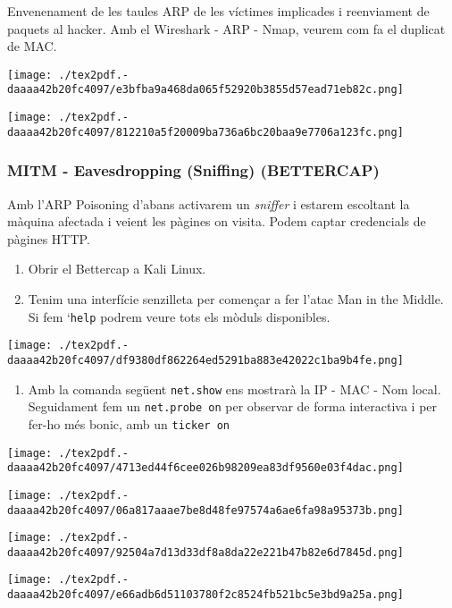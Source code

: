 \documentclass[]{article}
\providecommand{\tightlist}{%
  \setlength{\itemsep}{0pt}\setlength{\parskip}{0pt}}
\begin{document}
Envenenament de les taules ARP de les víctimes implicades i reenviament
de paquets al hacker. Amb el Wireshark - ARP - Nmap, veurem com fa el
duplicat de MAC.

\texttt{[image: ./tex2pdf.-daaaa42b20fc4097/e3bfba9a468da065f52920b3855d57ead71eb82c.png]}

\texttt{[image: ./tex2pdf.-daaaa42b20fc4097/812210a5f20009ba736a6bc20baa9e7706a123fc.png]}

\hypertarget{mitm---eavesdropping-sniffing-bettercap}{%
\subsubsection{\texorpdfstring{\textbf{MITM - Eavesdropping (Sniffing)
(BETTERCAP)}}{MITM - Eavesdropping (Sniffing) (BETTERCAP)}}\label{mitm---eavesdropping-sniffing-bettercap}}

Amb l'ARP Poisoning d'abans activarem un \emph{sniffer} i estarem
escoltant la màquina afectada i veient les pàgines on visita. Podem
captar credencials de pàgines HTTP.

\begin{enumerate}
\def\labelenumi{\arabic{enumi}.}
\item
  Obrir el Bettercap a Kali Linux.
\item
  Tenim una interfície senzilleta per començar a fer l'atac Man in the
  Middle. Si fem `\texttt{help} podrem veure tots els mòduls
  disponibles.
\end{enumerate}

\texttt{[image: ./tex2pdf.-daaaa42b20fc4097/df9380df862264ed5291ba883e42022c1ba9b4fe.png]}

\begin{enumerate}
\def\labelenumi{\arabic{enumi}.}
\setcounter{enumi}{1}
\tightlist
\item
  Amb la comanda següent \texttt{net.show} ens mostrarà la IP - MAC -
  Nom local. Seguidament fem un \texttt{net.probe\ on} per observar de
  forma interactiva i per fer-ho més bonic, amb un \texttt{ticker\ on}
\end{enumerate}

\texttt{[image: ./tex2pdf.-daaaa42b20fc4097/4713ed44f6cee026b98209ea83df9560e03f4dac.png]}

\texttt{[image: ./tex2pdf.-daaaa42b20fc4097/06a817aaae7be8d48fe97574a6ae6fa98a95373b.png]}

\texttt{[image: ./tex2pdf.-daaaa42b20fc4097/92504a7d13d33df8a8da22e221b47b82e6d7845d.png]}

\texttt{[image: ./tex2pdf.-daaaa42b20fc4097/e66adb6d51103780f2c8524fb521bc5e3bd9a25a.png]}
\end{document}
